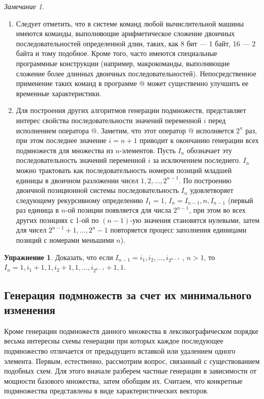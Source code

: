 \documentclass[12pt,a4paper]{article}
\theoremstyle{plain}
\theoremstyle{definition}
\newtheorem*{task}{Упражнение}
\theoremstyle{remark}
\newtheorem*{remark}{Замечание}
\begin{document}
\begin{remark}
~\\
\begin{enumerate}
\item Следует отметить, что в системе команд любой вычислительной машины имеются команды, выполняющие арифметическое сложение двоичных последовательностей определенной длин, таких, как 8 бит --- 1 байт, 16 --- 2 байта и тому подобное. Кроме того, часто имеются специальные программные конструкции (например, макрокоманды, выполняющие сложение более длинных двоичных последовательностей). Непосредственное применение таких команд в программе @ может существенно улучшить ее временные характеристики.
\item Для построения других алгоритмов генерации подмножеств, представляет интерес свойства последовательности значений переменной $i$ перед исполнением оператора \verb@{*}@. Заметим, что этот оператор \verb@{*}@ исполняется $2^n$ раз, при этом последнее значение $i=n+1$ приводит к окончанию генерации всех подмножеств для множества из $n$-элементов. Пусть $I_n$ обозначает эту последовательность значений переменной $i$ за исключением последнего. $I_n$ можно трактовать как последовательность номеров позиций младшей единицы в двоичном разложении чисел $1, 2,\ldots, 2^{n-1}$. По построению двоичной позиционной системы последовательность $I_n$ удовлетворяет следующему рекурсивному определению $I_1=1$, $I_n = I_{n-1},n,I_{n-1}$ (первый раз единица в $n$-ой позиции появляется для числа $2^{n-1}$, при этом во всех других позициях с 1-ой по $(n-1)$-ую значения становятся нулевыми, затем для чисел $2^{n-1}+1,\ldots,2^{n}-1$ повторяется процесс заполнения единицами позиций с номерами меньшими $n$).
\end{enumerate}
\end{remark}

\begin{task}
Доказать, что если $I_{n-1}=i_1, i_2, \ldots, i_{2^{n-1}}$ , $n>1$, то $I_n=1, i_1+1, 1, i_2+1, 1, \ldots, i_{2^{n-1}} + 1, 1$.
\end{task}

\subsection{Генерация подмножеств за счет их минимального изменения}
\label{sec:gray_codes}

Кроме генерации подмножеств данного множества в лексикографическом порядке весьма интересны схемы генерации при которых каждое последующее подмножество отличается от предыдущего вставкой или удалением одного элемента. Первым, естественно, рассмотрим вопрос, связанный с существованием подобных схем. Для этого вначале разберем частные генерации в зависимости от мощности базового множества, затем обобщим их. Считаем, что конкретные подмножества представлены в виде характеристических векторов.
\end{document}
